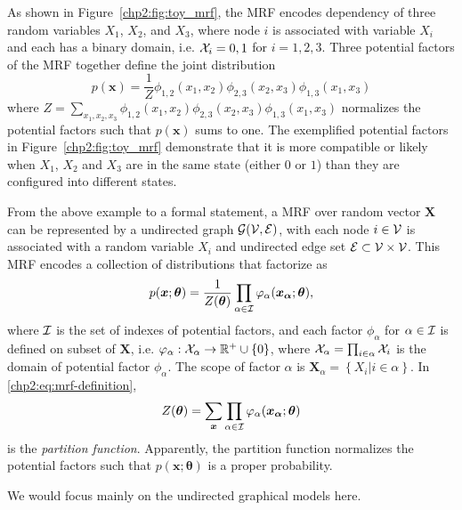 \begin{example}\label{chpt2:mrf-3node-example}
  As shown in Figure~\ref{chp2:fig:toy_mrf}, the MRF encodes dependency of three random variables $X_1$, $X_2$, and $X_3$, where node $i$ is associated with variable $X_i$ and each has a binary domain, i.e. $\mathcal{X}_i = {0,1}$ for $i =1,2,3$. Three potential factors of the MRF together define the joint distribution
  \begin{equation*}
    p(\bm{x}) = \frac{1}{Z} \phi_{1,2}(x_1, x_2) \phi_{2,3}(x_2, x_3) \phi_{1,3}(x_1, x_3)
  \end{equation*}
  where $Z = \sum_{x_1, x_2, x_3}\phi_{1,2}(x_1, x_2) \phi_{2,3}(x_2, x_3) \phi_{1,3}(x_1, x_3)$ normalizes the potential factors such that $p(\bm{x})$ sums to one. The exemplified potential factors in Figure~\ref{chp2:fig:toy_mrf} demonstrate that it is more compatible or likely when $X_1$, $X_2$ and $X_3$ are in the same state (either $0$ or $1$) than they are configured into different states.
\end{example}

From the above example to a formal statement, a MRF over random vector $\bm{X}$ can be represented by a undirected graph $\mathcal{G}(\mathcal{V}, \mathcal{E})$, with each node $i \in \mathcal{V}$ is associated with a random variable $X_i$ and undirected edge set $\mathcal{E} \subset \mathcal{V} \times \mathcal{V}$. This MRF encodes a collection of distributions that factorize as
\begin{equation}\label{chp2:eq:mrf-definition}
  p(\bm{x};\bm{\theta}) = \frac{1}{Z(\bm{\theta})} \prod_{\alpha \in \mathcal{I}} \varphi_{\alpha}(\bm{x_{\alpha}};\bm{\theta}),
\end{equation}
where $\mathcal{I}$ is the set of indexes of potential factors, and each factor $\phi_{\alpha}$ for $\alpha\in \mathcal{I}$ is defined on subset of $\bm{X}$, i.e. $\varphi_{\alpha}: \mathcal{X}_{\alpha} \rightarrow \mathbb{R}^{+} \cup \{0\}$, where $\mathcal{X}_{\alpha} = \prod_{i\in \alpha}\mathcal{X}_i$ is the domain of potential factor $\phi_{\alpha}$. The scope of factor $\alpha$ is $\bm{X}_{\alpha} = \left\{ X_i| i\in \alpha \right\}$. In \eqref{chp2:eq:mrf-definition},
\begin{equation}
  Z(\bm{\theta}) = \sum_{\bm{x}} \prod_{\alpha \in \mathcal{I}} \varphi_{\alpha}(\bm{x_{\alpha}};\bm{\theta})
\end{equation}
is the \textit{partition function}. Apparently, the partition function normalizes the potential factors such that $p(\bm{x}; \bm{\theta})$ is a proper probability.


We would focus mainly on the undirected graphical models here.


